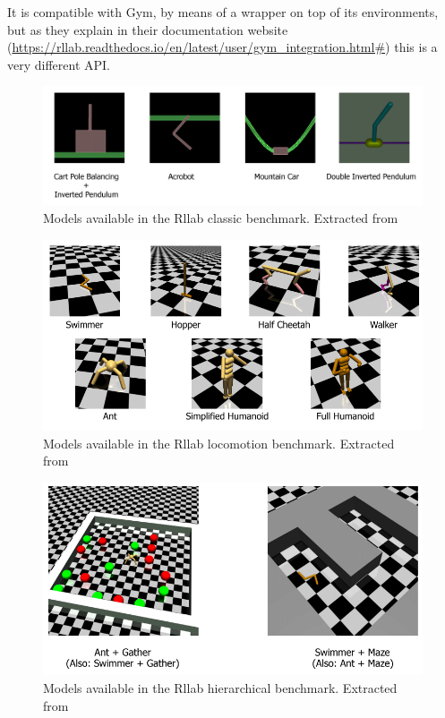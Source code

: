     It is compatible with Gym, by means of a wrapper on top of its environments, but as they explain in their documentation
    website (\url{https://rllab.readthedocs.io/en/latest/user/gym_integration.html#}) this is a very different API.

    \begin{figure}[!ht]
        \centering
        \includegraphics[width=5.0in]{./chapters/imgs/img_rllab_envs_classic.png}
        \caption[rllab classic models]{Models available in the Rllab classic benchmark. Extracted from \citet{Rllab}}
        \label{fig:rllab-envs-classic}
    \end{figure}

    \begin{figure}[!ht]
        \centering
        \includegraphics[width=4.5in]{./chapters/imgs/img_rllab_envs_locomotion.png}
        \caption[rllab locomotion models]{Models available in the Rllab locomotion benchmark. Extracted from \citet{Rllab}}
        \label{fig:rllab-envs-locomotion}
    \end{figure}

    \begin{figure}[!ht]
        \centering
        \includegraphics[width=5.0in]{./chapters/imgs/img_rllab_envs_hierarchical.png}
        \caption[rllab hierarchical models]{Models available in the Rllab hierarchical benchmark. Extracted from \citet{Rllab}}
        \label{fig:rllab-envs-hierarchical}
    \end{figure}

